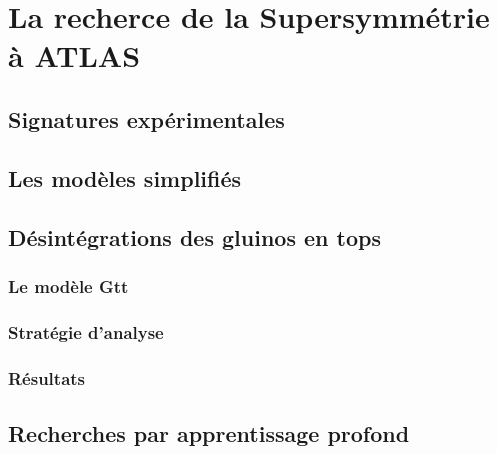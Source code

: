 \singlespacing{}
\chapter{La recherce de la Supersymmétrie à ATLAS}
\label{sec:susy_atlas}
\doublespacing{}

\section{Signatures expérimentales}
\label{sec:susy_atlas:signatures}

\section{Les modèles simplifiés}
\label{sec:susy_atlas:modele_simple}

\section{Désintégrations des gluinos en tops}
\label{sec:susy_atlas:gtt}

\subsection{Le modèle Gtt}
\label{sec:susy_atlas:gtt:gtt}

\subsection{Stratégie d'analyse}
\label{sec:susy_atlas:gtt:strategie}

\subsection{Résultats}
\label{sec:susy_atlas:gtt:resultats}

\section{Recherches par apprentissage profond}
\label{sec:susy_atlas:ml}
